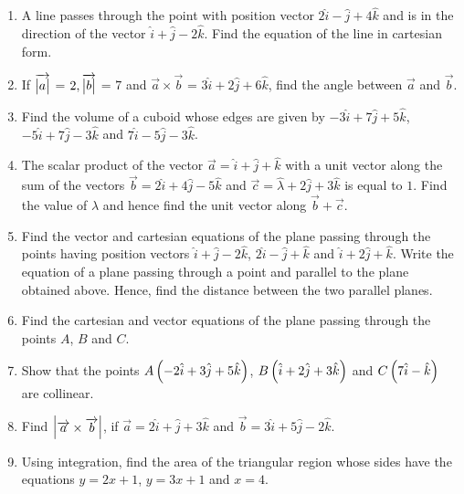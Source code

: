  \begin{enumerate}
 \item A line passes through the point with position vector $2\hat{i}-\hat{j}+4\hat{k}$ and is in the direction of the vector $\hat{i}+\hat{j}-2\hat{k}$. Find the equation of the line in cartesian form.
 
\item If ${\overrightarrow{\begin{vmatrix}a\end{vmatrix}}}$ = $2, {\overrightarrow{\begin{vmatrix}b\end{vmatrix}}}$ = $7$ and $\overrightarrow{a}\times\overrightarrow{b}$ = $3\hat{i}+2\hat{j}+6\hat{k}$, find the angle between $\overrightarrow{a}$ and $\overrightarrow{b}$.

\item Find the volume of a cuboid whose edges are given by $-3\hat{i}+7\hat{j}+5\hat{k}$,$-5\hat{i}+7\hat{j}-3\hat{k}$ and $7\hat{i}-5\hat{j}-3\hat{k}$.


\item The scalar product of the vector $\overrightarrow{a} = \hat{i}+\hat{j}+\hat{k}$ with a unit vector along the sum of the vectors $\overrightarrow{b} = 2\hat{i}+4\hat{j}-5\hat{k}$ and $\overrightarrow{c} = \hat{\lambda}+2\hat{j}+3\hat{k}$ is equal to $1$. Find the value of $\lambda$ and hence find the unit vector along $\overrightarrow{b}+\overrightarrow{c}$.

\item Find the vector and cartesian equations of the plane passing through the points having position vectors $\hat{i}+\hat{j}-2\hat{k}$, $2\hat{i}-\hat{j}+\hat{k}$ and $\hat{i}+2\hat{j}+\hat{k}$. Write the equation of a plane passing through a point  and parallel to the plane obtained above. Hence, find the distance between the two parallel planes.

\item Find the cartesian and vector equations of the plane passing through the points $A$, $B$ and $C$.

 \item Show that the points $A\left(-2\hat{i}+3\hat{j}+5\hat{k}\right)$, $B\left(\hat{i}+2\hat{j}+3\hat{k}\right)$ and $C\left(7\hat{i}-\hat{k}\right)$ are collinear.
 
 \item Find $\begin{vmatrix}\overrightarrow{a}\times\overrightarrow{b}\end{vmatrix}$, if $\overrightarrow{a}=2\hat{i}+\hat{j}+3\hat{k}$ and $\overrightarrow{b}=3\hat{i}+5\hat{j}-2\hat{k}$.
 
 \item Using integration, find the area of the triangular region whose sides have the equations ${y}={2x}+1$, ${y}={3x}+1$ and ${x}=4$.


\end{enumerate}
